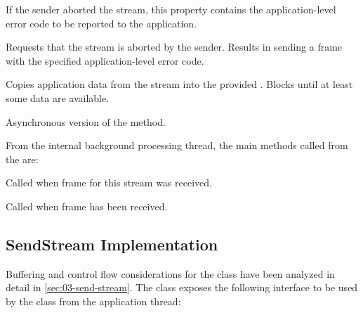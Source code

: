 \begin{description}

   If the sender aborted the stream, this property
contains the application-level error code to be reported to the application.

   Requests that the stream is aborted
by the sender. Results in sending a \STOPSENDING{} frame with the specified application-level error
code.

   Copies application data from
the stream into the provided \SpanOf{\Byte{}}. Blocks until at least some data are available.

   Asynchronous version of the  method.

\end{description}

From the internal background processing thread, the main methods called from the
\ManagedQuicConnection{} are:

\begin{description}

   Called when \RESETSTREAM{} frame
for this stream was received.

Called when \STREAM{} frame has been received.

\end{description}

\subsection{SendStream Implementation}

Buffering and control flow considerations for the \SendStream{} class have been analyzed in detail
in \autoref{sec:03-send-stream}. The \SendStream{} class exposes the following interface to be used
by the \ManagedQuicStream{} class from the application thread:

